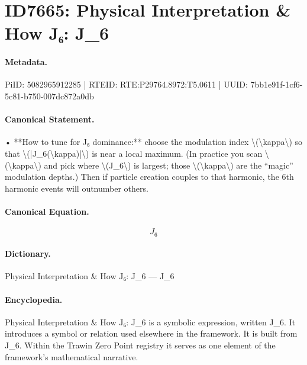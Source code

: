 \section*{ID7665: Physical Interpretation \& How J₆: J\_6}
\paragraph{Metadata.}
PiID: 5082965912285 | RTEID: RTE:P29764.8972:T5.0611 | UUID: 7bb1e91f-1cf6-5c81-b750-007dc872a0db

\paragraph{Canonical Statement.}
• **How to tune for J₆ dominance:** choose the modulation index \textbackslash{}(\textbackslash{}kappa\textbackslash{}) so that \textbackslash{}(|J\_6(\textbackslash{}kappa)|\textbackslash{}) is near a local maximum. (In practice you scan \textbackslash{}(\textbackslash{}kappa\textbackslash{}) and pick where \textbackslash{}(J\_6\textbackslash{}) is largest; those \textbackslash{}(\textbackslash{}kappa\textbackslash{}) are the “magic” modulation depths.) Then if particle creation couples to that harmonic, the 6th harmonic events will outnumber others.

\paragraph{Canonical Equation.}
\[
J_6
\]

\paragraph{Dictionary.}
Physical Interpretation \& How J₆: J\_6 — J\_6

\paragraph{Encyclopedia.}
Physical Interpretation \& How J₆: J\_6 is a symbolic expression, written J\_6. It introduces a symbol or relation used elsewhere in the framework. It is built from J\_6. Within the Trawin Zero Point registry it serves as one element of the framework's mathematical narrative.
